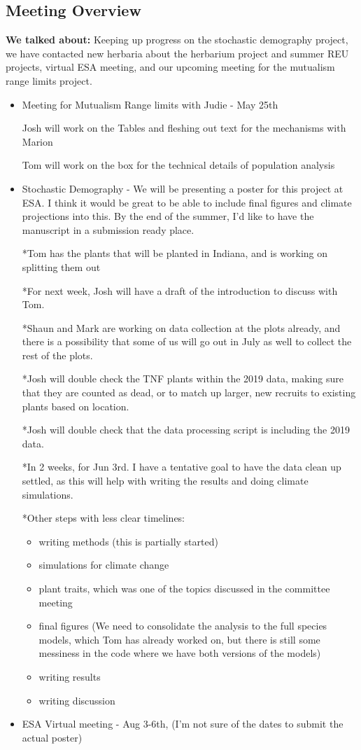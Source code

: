 \documentclass{article}
\begin{document}
\subsection*{Meeting Overview}
\textbf{We talked about:}
Keeping up progress on the stochastic demography project, we have contacted new herbaria about the herbarium project and summer REU projects, virtual ESA meeting, and our upcoming meeting for the mutualism range limits project.
\begin{itemize}
\item{Meeting for Mutualism Range limits with Judie - May 25th}

Josh will work on the Tables and fleshing out text for the mechanisms with Marion

Tom will work on the box for the technical details of population analysis

\item{Stochastic Demography - We will be presenting a poster for this project at ESA. I think it would be great to be able to include final figures and climate projections into this. By the end of the summer, I'd like to have the manuscript in a submission ready place.}

*Tom has the plants that will be planted in Indiana, and is working on splitting them out

*For next week, Josh will have a draft of the introduction to discuss with Tom.

*Shaun and Mark are working on data collection at the plots already, and there is a possibility that some of us will go out in July as well to collect the rest of the plots.


*Josh will double check the TNF plants within the 2019 data, making sure that they are counted as dead, or to match up larger, new recruits to existing plants based on location.

*Josh will double check that the data processing script is including the 2019 data.

*In 2 weeks, for Jun 3rd. I have a tentative goal to have the data clean up settled, as this will help with writing the results and doing climate simulations.

*Other steps with less clear timelines:
\begin{itemize}
\item{writing methods (this is partially started)}
\item{simulations for climate change}
\item{plant traits, which was one of the topics discussed in the committee meeting}
\item{final figures (We need to consolidate the analysis to the full species models, which Tom has already worked on, but there is still some messiness in the code where we have both versions of the models)}
\item{writing results}
\item{writing discussion}
\end{itemize}

\item{ESA Virtual meeting - Aug 3-6th, (I'm not sure of the dates to submit the actual poster)}

\end{itemize}
\end{document}
